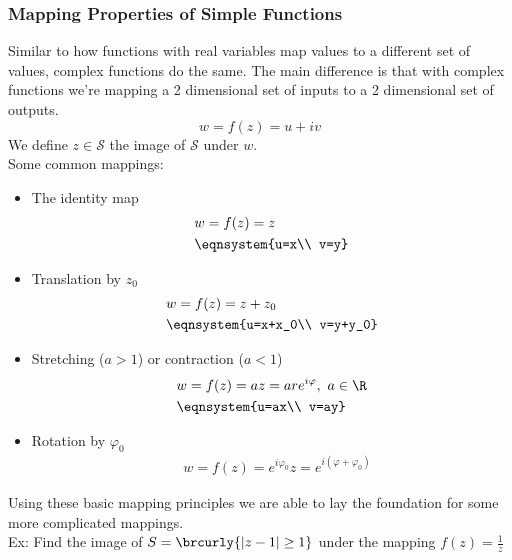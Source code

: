 \subsubsection{Mapping Properties of Simple Functions}
Similar to how functions with real variables map values to a different set of values, complex functions do the same. The main difference is that with complex functions we're mapping a 2 dimensional set of inputs to a 2 dimensional set of outputs.
\[
w=f(z)=u+iv
\]
We define $z\in \mathcal{S}$ the image of $\mathcal{S}$ under $w$.\\
Some common mappings:
\begin{itemize}
    \item The identity map
    \begin{align*}
        &w=f(z)=z\\
        &\eqnsystem{u=x\\ v=y}
    \end{align*}
    \item Translation by $z_0$
    \begin{align*}
        &w=f(z)=z+z_0\\
        &\eqnsystem{u=x+x_0\\ v=y+y_0}
    \end{align*}
    \item Stretching ($a>1$) or contraction ($a<1$)
    \begin{align*}
        &w=f(z)=az=are^{i\varphi},\ a\in\R\\
        &\eqnsystem{u=ax\\ v=ay}
    \end{align*}
    \item Rotation by $\varphi_0$
    \begin{align*}
        &w=f(z)=e^{i\varphi_0}z=e^{i(\varphi+\varphi_0)}
    \end{align*}
\end{itemize}
Using these basic mapping principles we are able to lay the foundation for some more complicated mappings.\\
Ex: Find the image of $S=\brcurly{|z-1|\geq1}$ under the mapping $f(z)=\frac{1}{z}$\\


